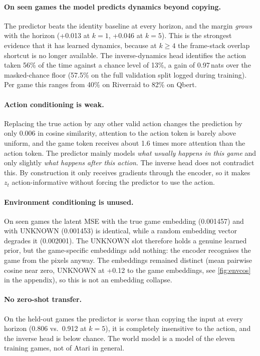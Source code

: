 \documentclass[runningheads]{llncs}
\begin{document}
\paragraph{On seen games the model predicts dynamics beyond copying.}
The predictor beats the identity baseline at every horizon, and the margin
\emph{grows} with the horizon (+0.013 at $k=1$, +0.046 at $k=5$). This is the strongest
evidence that it has learned dynamics, because at $k\ge4$ the frame-stack overlap
shortcut is no longer available. The inverse-dynamics head identifies the action taken
56\% of the time against a chance level of 13\%, a gain of 0.97\,nats over the
masked-chance floor (57.5\% on the full validation split logged during training). Per
game this ranges from 40\% on Riverraid to 82\% on Qbert.

\paragraph{Action conditioning is weak.}
Replacing the true action by any other valid action changes the prediction by only
0.006 in cosine similarity, attention to the action token is barely above uniform, and
the game token receives about 1.6 times more attention than the action token. The
predictor mainly models \emph{what usually happens in this game} and only slightly
\emph{what happens after this action}. The inverse head does not contradict this. By
construction it only receives gradients through the encoder, so it makes $z_t$
action-informative without forcing the predictor to use the action.

\paragraph{Environment conditioning is unused.}
On seen games the latent MSE with the true game embedding (0.001457) and with UNKNOWN
(0.001453) is identical, while a random embedding vector degrades it (0.002001). The
UNKNOWN slot therefore holds a genuine learned prior, but the game-specific embeddings add
nothing: the encoder recognises the game from the pixels anyway. The embeddings remained
distinct (mean pairwise cosine near zero, UNKNOWN at +0.12 to the game embeddings, see
\cref{fig:envcos} in the appendix), so this is not an embedding collapse.

\paragraph{No zero-shot transfer.}
On the held-out games the predictor is \emph{worse} than copying the input at every
horizon (0.806 vs.\ 0.912 at $k=5$), it is completely insensitive to the action, and the
inverse head is below chance. The world model is a model of the eleven training games,
not of Atari in general.
\end{document}
